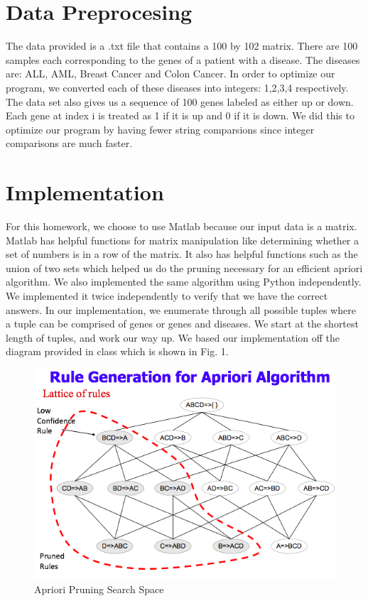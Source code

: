 \documentclass[12pt]{article}
\begin{document}
\section*{Data Preprocesing}
\noindent The data provided is a .txt file that contains a 100 by 102 matrix. There are 100 samples each corresponding to the genes of a patient with a disease. The diseases are: ALL, AML, Breast Cancer and Colon Cancer. In order to optimize our program, we converted each of these diseases into integers: 1,2,3,4 respectively. The data set also gives us a sequence of 100 genes labeled as either up or down. Each gene at index i is treated as 1 if it is up and 0 if it is down. We did this to optimize our program by having fewer string comparsions since integer comparisons are much faster. 

\section*{Implementation}
\noindent For this homework, we choose to use Matlab because our input data is a matrix. Matlab has helpful functions for matrix manipulation like determining whether a set of numbers is in a row of the matrix. It also has helpful functions such as the union of two sets which helped us do the pruning necessary for an efficient apriori algorithm. We also implemented the same algorithm using Python independently. We implemented it twice independently to verify that we have the correct answers. In our implementation, we enumerate through all possible tuples where a tuple can be comprised of genes or genes and diseases. We start at the shortest length of tuples, and work our way up. We based our implementation off the diagram provided in class which is shown in Fig. 1. 

\begin{figure}[h]
	\centering
	\includegraphics[width=\textwidth]{apriori}
	\caption{Apriori Pruning Search Space}
\end{figure}
\end{document}
